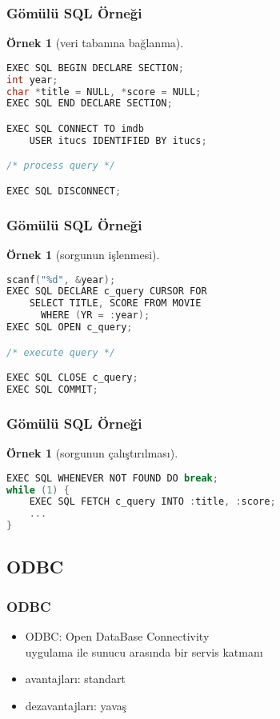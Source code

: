\documentclass[dvipsnames]{beamer}
\theoremstyle{definition}
\theoremstyle{example}
\newtheorem{ornek}[theorem]{Örnek}
\theoremstyle{plain}
\begin{document}
\begin{frame}[fragile]
  \frametitle{Gömülü SQL Örneği}

  \begin{ornek}[veri tabanına bağlanma]
    \begin{lstlisting}[language=C]
EXEC SQL BEGIN DECLARE SECTION;
int year;
char *title = NULL, *score = NULL;
EXEC SQL END DECLARE SECTION;

EXEC SQL CONNECT TO imdb
    USER itucs IDENTIFIED BY itucs;

/* process query */

EXEC SQL DISCONNECT;
    \end{lstlisting}
 \end{ornek}
\end{frame}

\begin{frame}[fragile]
  \frametitle{Gömülü SQL Örneği}

  \begin{ornek}[sorgunun işlenmesi]
    \begin{lstlisting}[language=C]
scanf("%d", &year);
EXEC SQL DECLARE c_query CURSOR FOR
    SELECT TITLE, SCORE FROM MOVIE
      WHERE (YR = :year);
EXEC SQL OPEN c_query;

/* execute query */

EXEC SQL CLOSE c_query;
EXEC SQL COMMIT;
    \end{lstlisting}
 \end{ornek}
\end{frame}

\begin{frame}[fragile]
  \frametitle{Gömülü SQL Örneği}

  \begin{ornek}[sorgunun çalıştırılması]
    \begin{lstlisting}[language=C]
EXEC SQL WHENEVER NOT FOUND DO break;
while (1) {
    EXEC SQL FETCH c_query INTO :title, :score;
    ...
}
    \end{lstlisting}
 \end{ornek}
\end{frame}

\lstset{language=ExtendedPHP}

\subsection{ODBC}

\begin{frame}[label=odbc]
  \frametitle{ODBC}

  \begin{itemize}
    \item \alert{ODBC}: Open DataBase Connectivity\\
      uygulama ile sunucu arasında bir servis katmanı

    \pause
    \bigskip
    \item avantajları: standart
    \item dezavantajları: yavaş
  \end{itemize}
\end{frame}
\end{document}

